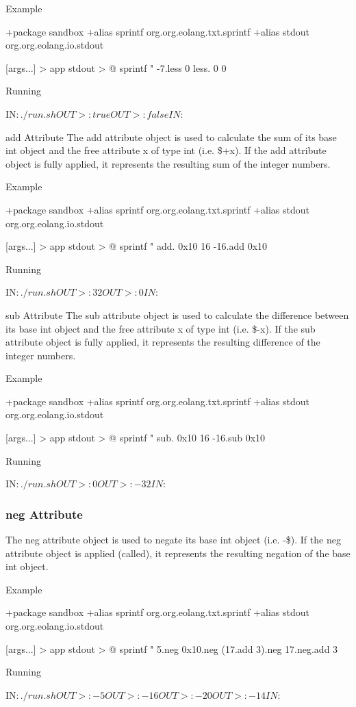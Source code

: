 \documentclass[12pt]{book}
\begin{document}
Example
\begin{ffcode}
+package sandbox
+alias sprintf org.org.eolang.txt.sprintf
+alias stdout org.org.eolang.io.stdout

[args...] > app
  stdout > @
    sprintf
      "%
      -7.less 0
      less.
        0
        0

Running

IN$: ./run.sh
OUT>: true
OUT>: false
IN$: 
\end{ffcode}
add Attribute
The add attribute object is used to calculate the sum of its base int object and the free attribute x of type int (i.e. \$+x).
If the add attribute object is fully applied, it represents the resulting sum of the integer numbers.

Example
\begin{ffcode}
+package sandbox
+alias sprintf org.org.eolang.txt.sprintf
+alias stdout org.org.eolang.io.stdout

[args...] > app
  stdout > @
    sprintf
      "%
      add.
        0x10
        16
      -16.add 0x10

Running

IN$: ./run.sh
OUT>: 32
OUT>: 0
IN$: 
\end{ffcode}
sub Attribute
The sub attribute object is used to calculate the difference between its base int object and the free attribute x of type int (i.e. \$-x).
If the sub attribute object is fully applied, it represents the resulting difference of the integer numbers.

Example
\begin{ffcode}
+package sandbox
+alias sprintf org.org.eolang.txt.sprintf
+alias stdout org.org.eolang.io.stdout

[args...] > app
  stdout > @
    sprintf
      "%
      sub.
        0x10
        16
      -16.sub 0x10

Running

IN$: ./run.sh
OUT>: 0
OUT>: -32
IN$: 
\end{ffcode}

\subsubsection{neg Attribute}
The neg attribute object is used to negate its base int object (i.e. -\$).
If the neg attribute object is applied (called), it represents the resulting negation of the base int object.

Example
\begin{ffcode}
+package sandbox
+alias sprintf org.org.eolang.txt.sprintf
+alias stdout org.org.eolang.io.stdout

[args...] > app
  stdout > @
    sprintf
      "%
      5.neg
      0x10.neg
      (17.add 3).neg
      17.neg.add 3

Running

IN$: ./run.sh
OUT>: -5
OUT>: -16
OUT>: -20
OUT>: -14
IN$: 
\end{ffcode}
\end{document}
